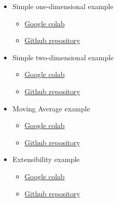 \begin{itemize}
\item Simple one-dimensional example
  \begin{itemize}
  \item \href{https://colab.research.google.com/drive/1lGRp0XrNfZ64NN0ASB_tYEKowXwlveDC}{Google colab}
  \item \href{https://github.com/givasile/edinburgh-thesis/blob/master/notebook_examples/example_1D.ipynb}{Github repository}
  \end{itemize}
 
\item Simple two-dimensional example
  \begin{itemize}
  \item
    \href{https://colab.research.google.com/drive/1Fof_WmCi1YizzSI_63aEsbLXsno5gSZ3}{Google colab}
  \item \href{https://github.com/givasile/edinburgh-thesis/blob/master/notebook_examples/example_2D.ipynb}{Github repository}
  \end{itemize}

\item Moving Average example  
  \begin{itemize}
  \item
    \href{https://colab.research.google.com/drive/1nkdACQ370SSc0KB1bHv4sBRaxMlMqoNH}{Google colab}
  \item
    \href{https://github.com/givasile/edinburgh-thesis/blob/master/notebook_examples/example_MA2.ipynb}{Github repository}
  \end{itemize}

\item Extensibility example
  \begin{itemize}
  \item
    \href{https://colab.research.google.com/drive/1RzB-V1QueP1y1nyzv_VOqR1nVz3DUH3v}{Google colab}
  \item
    \href{https://github.com/givasile/edinburgh-thesis/blob/master/notebook_examples/extending_romc.ipynb}{Github repository}
  \end{itemize}

\end{itemize}
